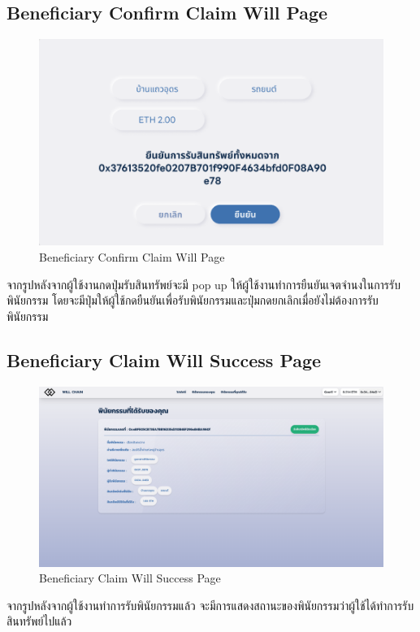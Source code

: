 \documentclass[12pt,oneside,openright,a4paper]{cpe-thai-project}
\begin{document}
\subsection{Beneficiary Confirm Claim Will Page}
	\begin{figure}[!thb]
			\centering
			\includegraphics[scale=0.2]{claimWillConfirm4}
			\caption{Beneficiary Confirm Claim Will Page }
		\end{figure}
		\FloatBarrier
\tab จากรูปหลังจากผู้ใช้งานกดปุ่มรับสินทรัพย์จะมี pop up ให้ผู้ใช้งานทำการยืนยันเจตจำนงในการรับพินัยกรรม โดยจะมีปุ่มให้ผู้ใช้กดยืนยันเพื่อรับพินัยกรรมและปุ่มกดยกเลิกเมื่อยังไม่ต้องการรับพินัยกรรม

\subsection{Beneficiary Claim Will Success Page }
	\begin{figure}[!thb]
			\centering
			\includegraphics[scale=0.2]{claimWillSuc4}
			\caption{Beneficiary Claim Will Success Page}
		\end{figure}
		\FloatBarrier
\tab จากรูปหลังจากผู้ใช้งานทำการรับพินัยกรรมแล้ว จะมีการแสดงสถานะของพินัยกรรมว่าผู้ใช้ได้ทำการรับสินทรัพย์ไปแล้ว
\end{document}

